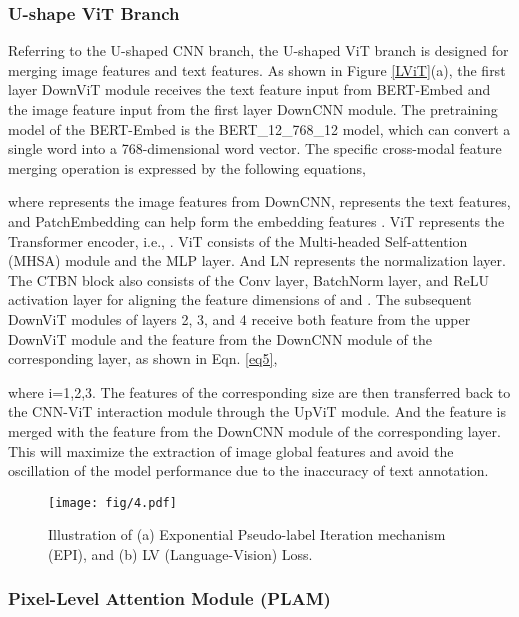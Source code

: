 \documentclass[lettersize,journal]{IEEEtran}
\begin{document}
\subsubsection{U-shape ViT Branch}
Referring to the U-shaped CNN branch, the U-shaped ViT branch is designed for merging image features and text features. As shown in Figure \ref{LViT}(a), the first layer DownViT module receives the text feature input from BERT-Embed \cite{56devlin2018bert} and the image feature input from the first layer DownCNN module. The pretraining model of the BERT-Embed is the BERT\_12\_768\_12 model, which can convert a single word into a 768-dimensional word vector. The specific cross-modal feature merging operation is expressed by the following equations,
\vspace{-2mm}

where  represents the image features from DownCNN,  represents the text features, and PatchEmbedding can help  form the embedding features . ViT represents the Transformer encoder\cite{42dosovitskiy2020image}, i.e., . ViT consists of the Multi-headed Self-attention (MHSA) module and the MLP layer. And LN represents the normalization layer. The CTBN block also consists of the Conv layer, BatchNorm layer, and ReLU activation layer for aligning the feature dimensions of  and . The subsequent DownViT modules of layers 2, 3, and 4 receive both feature from the upper DownViT module and the feature from the DownCNN module of the corresponding layer, as shown in Eqn. \ref{eq5}, 

where i=1,2,3. The features of the corresponding size are then transferred back to the CNN-ViT interaction module through the UpViT module. And the feature is merged with the feature from the DownCNN module of the corresponding layer. This will maximize the extraction of image global features and avoid the oscillation of the model performance due to the inaccuracy of text annotation.
\begin{figure}[ht]\centering
  \texttt{[image: fig/4.pdf]}
  \caption{Illustration of (a) Exponential Pseudo-label Iteration mechanism (EPI), and (b) LV (Language-Vision) Loss.}
  \label{EPI&LV}
  \vspace{-3mm}
\end{figure}
\subsubsection{\textbf{P}ixel-\textbf{L}evel \textbf{A}ttention \textbf{M}odule (PLAM)}
\end{document}
